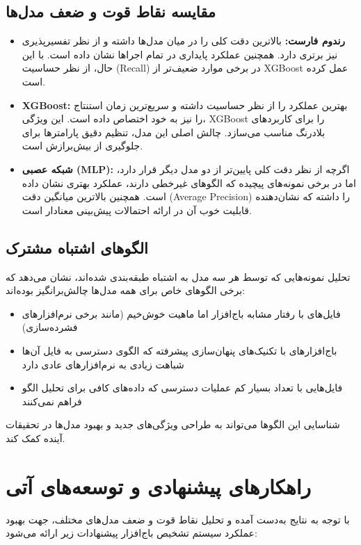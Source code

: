\subsection{مقایسه نقاط قوت و ضعف مدل‌ها}
\begin{itemize}
    \item \textbf{رندوم فارست:} بالاترین دقت کلی را در میان مدل‌ها داشته و از نظر تفسیرپذیری نیز برتری دارد. همچنین عملکرد پایداری در تمام اجراها نشان داده است. با این حال، از نظر حساسیت (Recall) در برخی موارد ضعیف‌تر از XGBoost عمل کرده است.

    \item \textbf{XGBoost:} بهترین عملکرد را از نظر حساسیت داشته و سریع‌ترین زمان استنتاج را نیز به خود اختصاص داده است. این ویژگی، XGBoost را برای کاربردهای بلادرنگ مناسب می‌سازد. چالش اصلی این مدل، تنظیم دقیق پارامترها برای جلوگیری از بیش‌برازش است.

    \item \textbf{شبکه عصبی (MLP):} اگرچه از نظر دقت کلی پایین‌تر از دو مدل دیگر قرار دارد، اما در برخی نمونه‌های پیچیده که الگوهای غیرخطی دارند، عملکرد بهتری نشان داده است. همچنین بالاترین میانگین دقت (Average Precision) را داشته که نشان‌دهنده قابلیت خوب آن در ارائه احتمالات پیش‌بینی معنادار است.
\end{itemize}

\subsection{الگوهای اشتباه مشترک}
تحلیل نمونه‌هایی که توسط هر سه مدل به اشتباه طبقه‌بندی شده‌اند، نشان می‌دهد که برخی الگوهای خاص برای همه مدل‌ها چالش‌برانگیز بوده‌اند:

\begin{itemize}
    \item فایل‌های با رفتار مشابه باج‌افزار اما ماهیت خوش‌خیم (مانند برخی نرم‌افزارهای فشرده‌سازی)
    \item باج‌افزارهای با تکنیک‌های پنهان‌سازی پیشرفته که الگوی دسترسی به فایل آن‌ها شباهت زیادی به نرم‌افزارهای عادی دارد
    \item فایل‌هایی با تعداد بسیار کم عملیات دسترسی که داده‌های کافی برای تحلیل الگو فراهم نمی‌کنند
\end{itemize}

شناسایی این الگوها می‌تواند به طراحی ویژگی‌های جدید و بهبود مدل‌ها در تحقیقات آینده کمک کند.

\section{راهکارهای پیشنهادی و توسعه‌های آتی}
با توجه به نتایج به‌دست آمده و تحلیل نقاط قوت و ضعف مدل‌های مختلف، جهت بهبود عملکرد سیستم تشخیص باج‌افزار پیشنهادات زیر ارائه می‌شود:

